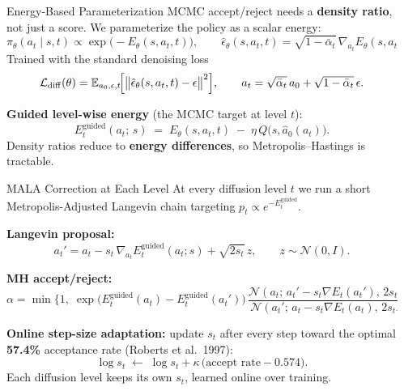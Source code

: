\documentclass[final,hyperref={pdfpagelabels=false}]{beamer}
\newlength{\colwidth}
\begin{document}
\begin{frame}[t]
\begin{columns}[t]
\begin{column}{\colwidth}
\end{column}

\begin{column}{\colwidth}

\begin{block}{\Large Energy-Based Parameterization}
MCMC accept/reject needs a \textbf{density ratio}, not just a score. We parameterize the policy as a scalar energy:
\[
\pi_\theta(a_t\mid s,t)\propto \exp\!\bigl(-E_\theta(s,a_t,t)\bigr),
\qquad
\hat\epsilon_\theta(s,a_t,t)=\sqrt{1-\bar\alpha_t}\,\nabla_{a_t} E_\theta(s,a_t,t).
\]
Trained with the standard denoising loss
\[
\mathcal{L}_{\mathrm{diff}}(\theta)=\mathbb{E}_{a_0,\epsilon,t}\!\Bigl[\bigl\|\hat\epsilon_\theta(s,a_t,t)-\epsilon\bigr\|^2\Bigr],
\qquad a_t=\sqrt{\bar\alpha_t}\,a_0+\sqrt{1-\bar\alpha_t}\,\epsilon.
\]

\vspace{0.3em}
\textbf{Guided level-wise energy} (the MCMC target at level $t$):
\[
E_t^{\mathrm{guided}}(a_t;\,s) \;=\; E_\theta(s,a_t,t) \;-\; \eta\, Q\!\bigl(s,\hat a_0(a_t)\bigr).
\]
Density ratios reduce to \textbf{energy differences}, so Metropolis--Hastings is tractable.
\end{block}

\vspace{1cm}

\begin{block}{\Large MALA Correction at Each Level}
At every diffusion level $t$ we run a short Metropolis-Adjusted Langevin chain targeting $p_t\propto e^{-E_t^{\mathrm{guided}}}$.

\vspace{0.3em}
\textbf{Langevin proposal:}
\[
a_t' = a_t - s_t\,\nabla_{a_t} E_t^{\mathrm{guided}}(a_t;s) + \sqrt{2 s_t}\,z,\qquad z\sim\mathcal{N}(0,I).
\]

\vspace{0.2em}
\textbf{MH accept/reject:}
\[
\alpha = \min\!\Biggl\{1,\;\exp\!\bigl(E_t^{\mathrm{guided}}(a_t)-E_t^{\mathrm{guided}}(a_t')\bigr)\,\frac{\mathcal{N}(a_t;\,a_t' - s_t\nabla E_t(a_t'),\,2s_t I)}{\mathcal{N}(a_t';\,a_t - s_t\nabla E_t(a_t),\,2s_t I)}\Biggr\}.
\]

\vspace{0.3em}
\textbf{Online step-size adaptation:} update $s_t$ after every step toward the optimal \textbf{57.4\%} acceptance rate (Roberts et al.\ 1997):
\[
\log s_t \;\leftarrow\; \log s_t + \kappa\,\bigl(\text{accept rate} - 0.574\bigr).
\]
Each diffusion level keeps its own $s_t$, learned online over training.
\end{block}


\end{column}
\end{columns}
\end{frame}
\end{document}
